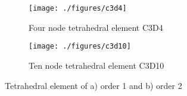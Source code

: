 \documentclass[meshing_micro.tex]{subfiles}
\begin{document}
	


\begin{figure}
\centering
\begin{subfigure}[b]{.5\textwidth}
  \centering
  \texttt{[image: ./figures/c3d4]}
  \caption{Four node tetrahedral element C3D4}
  \label{fig:mesh_a}
\end{subfigure}%
\begin{subfigure}[b]{.5\textwidth}
  \centering
  \texttt{[image: ./figures/c3d10]}
  \caption{Ten node tetrahedral element C3D10}
  \label{fig:mesh_b}
\end{subfigure}
\caption{Tetrahedral element of a) order 1 and b) order 2}
\label{fig:mesh}
\end{figure}
\end{document}
